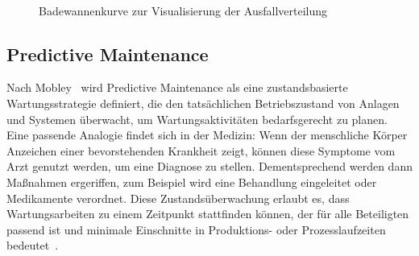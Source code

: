 \begin{figure}[H]
    \centering
    \caption{Badewannenkurve zur Visualisierung der Ausfallverteilung}
~\label{fig:bathtub}
\end{figure}

\subsection{Predictive Maintenance}
Nach Mobley~\Cite[S.~4]{Mobley2002} wird Predictive Maintenance als eine zustandsbasierte Wartungsstrategie definiert, die den
tatsächlichen Betriebszustand von Anlagen und Systemen überwacht, um Wartungsaktivitäten bedarfsgerecht zu planen.
Eine passende Analogie findet sich in der Medizin: Wenn der menschliche Körper Anzeichen einer bevorstehenden Krankheit zeigt, können
diese Symptome vom Arzt genutzt werden, um eine Diagnose zu stellen. Dementsprechend werden dann Maßnahmen ergeriffen, zum Beispiel
wird eine Behandlung eingeleitet oder Medikamente verordnet. Diese Zustandsüberwachung erlaubt es, dass Wartungsarbeiten zu einem
Zeitpunkt stattfinden können, der für alle Beteiligten passend ist und minimale Einschnitte in Produktions- oder Prozesslaufzeiten
bedeutet~\cite[S.~3]{Scheffer2004}.

